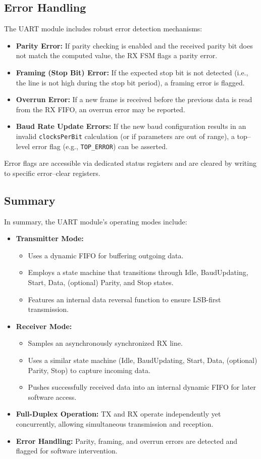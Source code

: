 \subsection{Error Handling}

The UART module includes robust error detection mechanisms:
\begin{itemize}
    \item \textbf{Parity Error:} If parity checking is enabled and the received parity bit does not match the computed value, the RX FSM flags a parity error.
    \item \textbf{Framing (Stop Bit) Error:} If the expected stop bit is not detected (i.e., the line is not high during the stop bit period), a framing error is flagged.
    \item \textbf{Overrun Error:} If a new frame is received before the previous data is read from the RX FIFO, an overrun error may be reported.
    \item \textbf{Baud Rate Update Errors:} If the new baud configuration results in an invalid \texttt{clocksPerBit} calculation (or if parameters are out of range), a top–level error flag (e.g., \texttt{TOP\_ERROR}) can be asserted.
\end{itemize}
Error flags are accessible via dedicated status registers and are cleared by writing to specific error–clear registers.

\subsection{Summary}

In summary, the UART module’s operating modes include:
\begin{itemize}
    \item \textbf{Transmitter Mode:} 
    \begin{itemize}
        \item Uses a dynamic FIFO for buffering outgoing data.
        \item Employs a state machine that transitions through Idle, BaudUpdating, Start, Data, (optional) Parity, and Stop states.
        \item Features an internal data reversal function to ensure LSB-first transmission.
    \end{itemize}
    \item \textbf{Receiver Mode:} 
    \begin{itemize}
        \item Samples an asynchronously synchronized RX line.
        \item Uses a similar state machine (Idle, BaudUpdating, Start, Data, (optional) Parity, Stop) to capture incoming data.
        \item Pushes successfully received data into an internal dynamic FIFO for later software access.
    \end{itemize}
    \item \textbf{Full-Duplex Operation:} TX and RX operate independently yet concurrently, allowing simultaneous transmission and reception.
    \item \textbf{Error Handling:} Parity, framing, and overrun errors are detected and flagged for software intervention.
\end{itemize}
